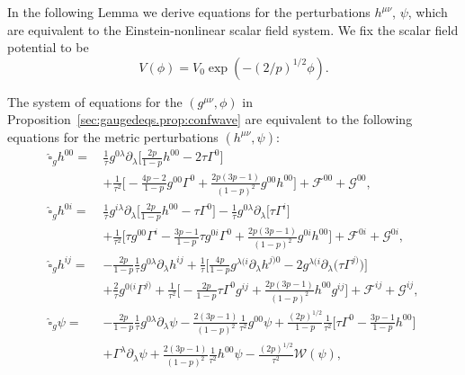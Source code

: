 \documentclass{article}
\newcommand{\mc}{\mathcal}
\newcommand{\wh}{\widehat}
\newcommand{\pa}{\partial}
\begin{document}
In the following Lemma we derive equations for the perturbations $h^{\mu\nu}$, $\psi$, which are equivalent to the Einstein-nonlinear scalar field system. We fix the scalar field potential to be
\begin{equation}
    V(\phi) = V_0 \exp(-(2/p)^{1/2}\phi).
\end{equation}
\begin{lemma}\label{lem:waveequationsperturbations}
    The system of equations for the $(g^{\mu\nu},\phi)$ in Proposition~\ref{sec:gaugedeqs.prop:confwave} are equivalent to the following equations for the metric perturbations $(h^{\mu\nu},\psi)$:
    \begin{subequations}
        \begin{align}
            \wh{\square}_g  h^{00} =\,& \frac{1}{\tau}g^{0\lambda}\pa_\lambda\Big[\frac{2p}{1-p} h^{00} - 2\tau\Gamma^0\Big]\nonumber\\
            &+\frac{1}{\tau^2}\Big[-\frac{4p-2}{1-p}g^{00}\Gamma^0 + \frac{2p(3p-1)}{(1-p)^2}g^{00} h^{00}\Big] +\mc{F}^{00}+\mc{G}^{00},\label{sec:gaugedeqs.eq:wavelapseungauged}\\
            \wh{\square}_g  h^{0i} =\,& \frac{1}{\tau}g^{i\lambda}\pa_\lambda\Big[\frac{2p}{1-p} h^{00} - \tau \Gamma^{0}\Big] - \frac{1}{\tau}g^{0\lambda}\pa_\lambda \Big[\tau \Gamma^{i}\Big]\nonumber\\
            &+ \frac{1}{\tau^2}\Big[\tau g^{00}\Gamma^i-\frac{3p-1}{1-p}\tau g^{0i}\Gamma^{0}   + \frac{2p(3p-1)}{(1-p)^2}g^{0i} h^{00}\Big] +\mc{F}^{0i}+\mc{G}^{0i},\label{sec:gaugedeqs.eq:waveshiftungauged}\\
            \wh{\square}_g  h^{ij} =& -\frac{2p}{1-p}\frac{1}{\tau}g^{0\lambda}\pa_\lambda  h^{ij} + \boxed{\frac{1}{\tau}\Big[\frac{4p}{1-p}g^{\lambda(i}\pa_\lambda h^{j)0} - 2g^{\lambda(i}\pa_\lambda\big(\tau \Gamma^{j)}\big)\Big]}\nonumber\\
            &+\frac{2}{\tau} g^{0(i}\Gamma^{j)} + \boxed{\frac{1}{\tau^2}\Big[-\frac{2p}{1-p}\tau\Gamma^0g^{ij} + \frac{2p(3p-1)}{(1-p)^2} h^{00}g^{ij}\Big]} + \mc{F}^{ij}+\mc{G}^{ij},\label{sec:gaugedeqs.sec:gaugedeqs.eq:wavehoriungauged}\\
            \wh{\square}_g \psi =\,& -\frac{2p}{1-p}\frac{1}{\tau}g^{0\lambda}\pa_\lambda \psi - \frac{2(3p-1)}{(1-p)^2}\frac{1}{\tau^2}g^{00}\psi + \boxed{\frac{(2p)^{1/2}}{1-p}\frac{1}{\tau^2}\Big[\tau\Gamma^0 - \frac{3p-1}{1-p}h^{00}\Big]}\nonumber\\
            &+ \Gamma^\lambda \pa_\lambda \psi + \frac{2(3p-1)}{(1-p)^2}\frac{1}{\tau^2} h^{00}\psi - \frac{(2p)^{1/2}}{\tau^2}\mc{W}(\psi),\label{sec:gaugedeqs.eq:wavescalarungauged}

\end{align}
\end{subequations}
\end{lemma}
\end{document}
